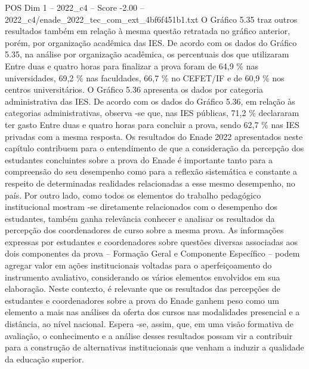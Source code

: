 \begin{textsample}{POS Dim 1 – 2022\_c4 – Score -2.00 – 2022\_c4/enade\_2022\_tec\_com\_ext\_4bf6f451b1.txt}
O Gráfico 5.35 traz outros resultados também em relação à mesma questão retratada no gráfico anterior, porém, por organização acadêmica das IES.
De acordo com os dados do Gráfico 5.35, na análise por organização acadêmica, os percentuais dos que utilizaram Entre duas e quatro horas para finalizar a prova foram de 64,9 \% nas universidades, 69,2 \% nas faculdades, 66,7 \% no CEFET/IF e de 60,9 \% nos centros universitários.
O Gráfico 5.36 apresenta os dados por categoria administrativa das IES.
De acordo com os dados do Gráfico 5.36, em relação às categorias administrativas, observa -se que, nas IES públicas, 71,2 \% declararam ter gasto Entre duas e quatro horas para concluir a prova, sendo 62,7 \% nas IES privadas com a mesma resposta.
Os resultados do Enade 2022 apresentados neste capítulo contribuem para o entendimento de que a consideração da percepção dos estudantes concluintes sobre a prova do Enade é importante tanto para a compreensão do seu desempenho como para a reflexão sistemática e constante a respeito de determinadas realidades relacionadas a esse mesmo desempenho, no país.
Por outro lado, como todos os elementos do trabalho pedagógico institucional mostram -se diretamente relacionados com o desempenho dos estudantes, também ganha relevância conhecer e analisar os resultados da percepção dos coordenadores de curso sobre a mesma prova.
As informações expressas por estudantes e coordenadores sobre questões diversas associadas aos dois componentes da prova – Formação Geral e Componente Específico – podem agregar valor em ações institucionais voltadas para o aperfeiçoamento do instrumento avaliativo, considerando os vários elementos envolvidos em sua elaboração.
Neste contexto, é relevante que os resultados das percepções de estudantes e coordenadores sobre a prova do Enade ganhem peso como um elemento a mais nas análises da oferta dos cursos nas modalidades presencial e a distância, ao nível nacional.
Espera -se, assim, que, em uma visão formativa de avaliação, o conhecimento e a análise desses resultados possam vir a contribuir para a construção de alternativas institucionais que venham a induzir a qualidade da educação superior.

\end{textsample}
